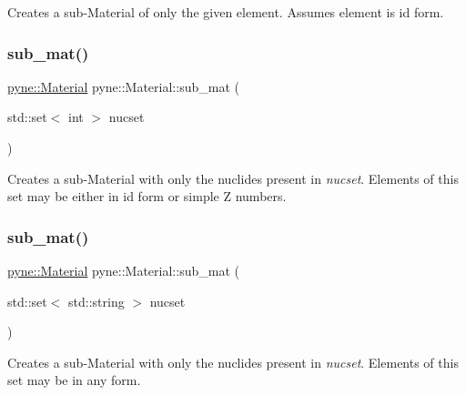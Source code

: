 Creates a sub-\/\+Material of only the given element. Assumes element is id form. \mbox{\label{classpyne_1_1_material_a50c2deb6e8513bfb101c5b2992e7f5dc}} 
\subsubsection{\texorpdfstring{sub\+\_\+mat()}{sub\_mat()}\hspace{0.1cm}{\footnotesize\ttfamily [1/2]}}
{\footnotesize\ttfamily \hyperlink{classpyne_1_1_material}{pyne\+::\+Material} pyne\+::\+Material\+::sub\+\_\+mat (\begin{DoxyParamCaption}\item[{std\+::set$<$ int $>$}]{nucset }\end{DoxyParamCaption})}

Creates a sub-\/\+Material with only the nuclides present in {\itshape nucset}. Elements of this set may be either in id form or simple Z numbers. \mbox{\label{classpyne_1_1_material_a7cd9de1e2a7a80b5beb4946667823b68}} 
\subsubsection{\texorpdfstring{sub\+\_\+mat()}{sub\_mat()}\hspace{0.1cm}{\footnotesize\ttfamily [2/2]}}
{\footnotesize\ttfamily \hyperlink{classpyne_1_1_material}{pyne\+::\+Material} pyne\+::\+Material\+::sub\+\_\+mat (\begin{DoxyParamCaption}\item[{std\+::set$<$ std\+::string $>$}]{nucset }\end{DoxyParamCaption})}

Creates a sub-\/\+Material with only the nuclides present in {\itshape nucset}. Elements of this set may be in any form. \mbox{\label{classpyne_1_1_material_adfc05d7c09a0908047a9b733aa7c78b1}} 
